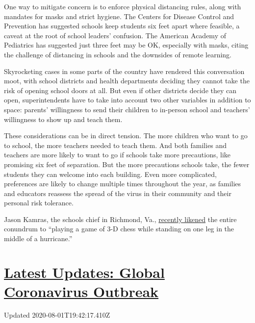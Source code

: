 One way to mitigate concern is to enforce physical distancing rules,
along with mandates for masks and strict hygiene. The Centers for
Disease Control and Prevention has suggested schools keep students six
feet apart where feasible, a caveat at the root of school leaders'
confusion. The American Academy of Pediatrics has suggested just three
feet may be OK, especially with masks, citing the challenge of
distancing in schools and the downsides of remote learning.

Skyrocketing cases in some parts of the country have rendered this
conversation moot, with school districts and health departments deciding
they cannot take the risk of opening school doors at all. But even if
other districts decide they can open, superintendents have to take into
account two other variables in addition to space: parents' willingness
to send their children to in-person school and teachers' willingness to
show up and teach them.

These considerations can be in direct tension. The more children who
want to go to school, the more teachers needed to teach them. And both
families and teachers are more likely to want to go if schools take more
precautions, like promising six feet of separation. But the more
precautions schools take, the fewer students they can welcome into each
building. Even more complicated, preferences are likely to change
multiple times throughout the year, as families and educators reassess
the spread of the virus in their community and their personal risk
tolerance.

Jason Kamras, the schools chief in Richmond, Va.,
\href{https://twitter.com/jasonkamras/status/1280870903610556417}{recently
likened} the entire conundrum to ``playing a game of 3-D chess while
standing on one leg in the middle of a hurricane.''

\hypertarget{latest-updates-global-coronavirus-outbreak}{%
\section{\texorpdfstring{\href{https://www.nytimes3xbfgragh.onion/2020/08/01/world/coronavirus-covid-19.html?action=click\&pgtype=Article\&state=default\&region=MAIN_CONTENT_1\&context=storylines_live_updates}{Latest
Updates: Global Coronavirus
Outbreak}}{Latest Updates: Global Coronavirus Outbreak}}\label{latest-updates-global-coronavirus-outbreak}}

Updated 2020-08-01T19:42:17.410Z

